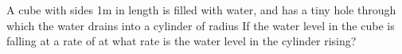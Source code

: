 A cube with sides 1m in length is filled with water, and has a tiny hole through which the water drains into a cylinder of radius  If the water level in the cube is falling at a rate of  at what rate is the water level in the cylinder rising?
